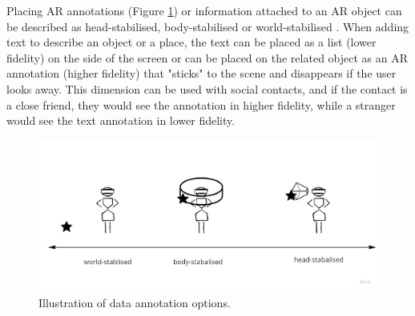 Placing AR annotations (Figure \ref{fig:continuum:data-annotation}) or information attached to an AR object can be described as head-stabilised, body-stabilised or world-stabilised \cite{Billinghurst1998}. When adding text to describe an object or a place, the text can be placed as a list (lower fidelity) on the side of the screen or can be placed on the related object as an AR annotation (higher fidelity) that "sticks" to the scene and disappears if the user looks away. This dimension can be used with social contacts, and if the contact is a close friend, they would see the annotation in higher fidelity, while a stranger would see the text annotation in lower fidelity. 


\begin{figure}[ht]
    \centering
    \includegraphics[width=0.8\linewidth]{images/30-continuum/continuum-annotation.jpg}
    \caption{Illustration of data annotation options.}
    \label{fig:continuum:data-annotation}
\end{figure}




